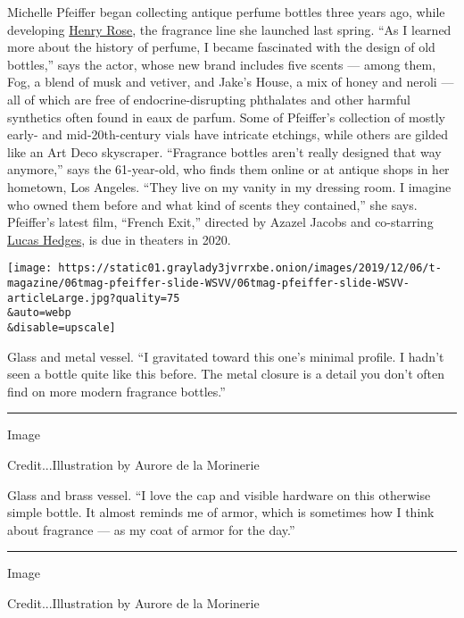 Michelle Pfeiffer began collecting antique perfume bottles three years
ago, while developing \href{https://henryrose.com/}{Henry Rose}, the
fragrance line she launched last spring. ``As I learned more about the
history of perfume, I became fascinated with the design of old
bottles,'' says the actor, whose new brand includes five scents ---
among them, Fog, a blend of musk and vetiver, and Jake's House, a mix of
honey and neroli --- all of which are free of endocrine-disrupting
phthalates and other harmful synthetics often found in eaux de parfum.
Some of Pfeiffer's collection of mostly early- and mid-20th-century
vials have intricate etchings, while others are gilded like an Art Deco
skyscraper. ``Fragrance bottles aren't really designed that way
anymore,'' says the 61-year-old, who finds them online or at antique
shops in her hometown, Los Angeles. ``They live on my vanity in my
dressing room. I imagine who owned them before and what kind of scents
they contained,'' she says. Pfeiffer's latest film, ``French Exit,''
directed by Azazel Jacobs and co-starring
\href{https://www.nytimes3xbfgragh.onion/2018/12/03/movies/lucas-hedges-ben-is-back.html}{Lucas
Hedges}, is due in theaters in 2020.

\texttt{[image: https://static01.graylady3jvrrxbe.onion/images/2019/12/06/t-magazine/06tmag-pfeiffer-slide-WSVV/06tmag-pfeiffer-slide-WSVV-articleLarge.jpg?quality=75\\\&auto=webp\\\&disable=upscale]}

Glass and metal vessel. ``I gravitated toward this one's minimal
profile. I hadn't seen a bottle quite like this before. The metal
closure is a detail you don't often find on more modern fragrance
bottles.''

\begin{center}\rule{0.5\linewidth}{\linethickness}\end{center}

Image

Credit...Illustration by Aurore de la Morinerie

Glass and brass vessel. ``I love the cap and visible hardware on this
otherwise simple bottle. It almost reminds me of armor, which is
sometimes how I think about fragrance --- as my coat of armor for the
day.''

\begin{center}\rule{0.5\linewidth}{\linethickness}\end{center}

Image

Credit...Illustration by Aurore de la Morinerie

